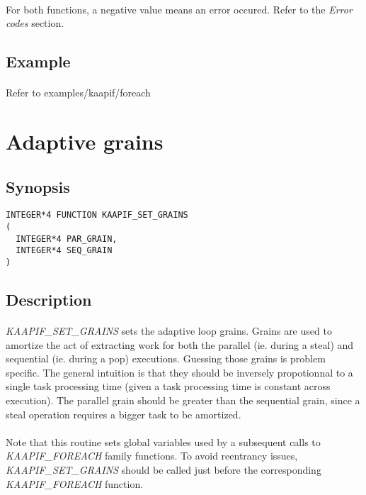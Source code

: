 \documentclass[a4paper, 11pt]{article}
\begin{document}
\paragraph{}
For both functions, a negative value means an error occured. Refer to the
\textit{Error codes} section.

\subsection{Example}
\paragraph{}
Refer to examples/kaapif/foreach


\newpage
\section{Adaptive grains}

\subsection{Synopsis}
\begin{small}
\lstset{language=C}
\begin{lstlisting}[frame=tb]
INTEGER*4 FUNCTION KAAPIF_SET_GRAINS
(
  INTEGER*4 PAR_GRAIN,
  INTEGER*4 SEQ_GRAIN
)
\end{lstlisting}
\end{small}

\subsection{Description}
\paragraph{}
\textit{KAAPIF\_SET\_GRAINS} sets the adaptive loop grains. Grains are used
to amortize the act of extracting work for both the parallel (ie. during a
steal) and sequential (ie. during a pop) executions. Guessing those grains
is problem specific. The general intuition is that they should be inversely
propotionnal to a single task processing time (given a task processing time
is constant across execution). The parallel grain should be greater than the
sequential grain, since a steal operation requires a bigger task to be amortized.

\paragraph{}
Note that this routine sets global variables used by a subsequent calls to
\textit{KAAPIF\_FOREACH} family functions. To avoid reentrancy issues,
\textit{KAAPIF\_SET\_GRAINS} should be called just before the corresponding
\textit{KAAPIF\_FOREACH} function.
\end{document}
